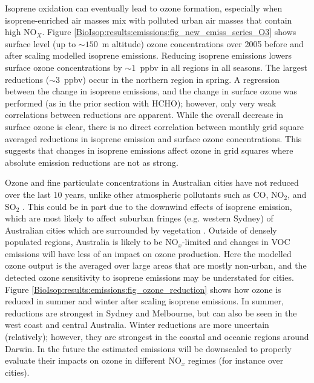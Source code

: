       Isoprene oxidation can eventually lead to ozone formation, especially when isoprene-enriched air masses mix with polluted urban air masses that contain high NO$_X$.
      Figure \ref{BioIsop:results:emissions:fig_new_emiss_series_O3} shows surface level (up to $\sim{150}$~m altitude) ozone concentrations over 2005 before and after scaling modelled isoprene emissions.
      Reducing isoprene emissions lowers surface ozone concentrations by $\sim1$~ppbv in all regions in all seasons.
      The largest reductions ($\sim3$~ppbv) occur in the northern region in spring.
      A regression between the change in isoprene emissions, and the change in surface ozone was performed (as in the prior section with HCHO); however, only very weak correlations between reductions are apparent.
      While the overall decrease in surface ozone is clear, there is no direct correlation between monthly grid square averaged reductions in isoprene emission and surface ozone concentrations.
      This suggests that changes in isoprene emissions affect ozone in grid squares where absolute emission reductions are not as strong.
      
      
      
      Ozone and fine particulate concentrations in Australian cities have not reduced over the last 10 years, unlike other atmospheric pollutants such as CO, NO$_2$, and SO$_2$ \parencite{SOE2016}.
      This could be in part due to the downwind effects of isoprene emission, which are most likely to affect suburban fringes (e.g. western Sydney) of Australian cities which are surrounded by vegetation \parencite{Millet2016}.
      Outside of densely populated regions, Australia is likely to be NO$_x$-limited and changes in VOC emissions will have less of an impact on ozone production.
      Here the modelled ozone output is the averaged over large areas that are mostly non-urban, and the detected ozone sensitivity to isoprene emissions may be understated for cities.
      Figure \ref{BioIsop:results:emissions:fig_ozone_reduction} shows how ozone is reduced in summer and winter after scaling isoprene emissions.
      In summer, reductions are strongest in Sydney and Melbourne, but can also be seen in the west coast and central Australia.
      Winter reductions are more uncertain (relatively); however, they are strongest in the coastal and oceanic regions around Darwin.
      In the future the estimated emissions will be downscaled to properly evaluate their impacts on ozone in different NO$_x$ regimes (for instance over cities).
      
